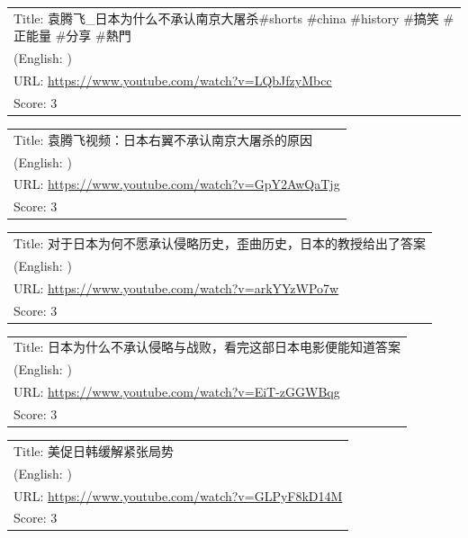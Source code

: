 \documentclass{article}
\begin{document}
\noindent
\begin{tabular}{p{}}
Title: 袁腾飞\_日本为什么不承认南京大屠杀\#shorts \#china \#history  \#搞笑 \#正能量 \#分享 \#熱門 \\
(English: ) \\
URL: \url{https://www.youtube.com/watch?v=LQbJfzyMbcc} \\
Score: 3 \\
\end{tabular}
\vspace{0.5em}

\noindent
\begin{tabular}{p{}}
Title: 袁腾飞视频：日本右翼不承认南京大屠杀的原因 \\
(English: ) \\
URL: \url{https://www.youtube.com/watch?v=GpY2AwQaTjg} \\
Score: 3 \\
\end{tabular}
\vspace{0.5em}

\noindent
\begin{tabular}{p{}}
Title: 对于日本为何不愿承认侵略历史，歪曲历史，日本的教授给出了答案 \\
(English: ) \\
URL: \url{https://www.youtube.com/watch?v=arkYYzWPo7w} \\
Score: 3 \\
\end{tabular}
\vspace{0.5em}

\noindent
\begin{tabular}{p{}}
Title: 日本为什么不承认侵略与战败，看完这部日本电影便能知道答案 \\
(English: ) \\
URL: \url{https://www.youtube.com/watch?v=EiT-zGGWBqg} \\
Score: 3 \\
\end{tabular}
\vspace{0.5em}

\noindent
\begin{tabular}{p{}}
Title: 美促日韩缓解紧张局势 \\
(English: ) \\
URL: \url{https://www.youtube.com/watch?v=GLPyF8kD14M} \\
Score: 3 \\
\end{tabular}
\vspace{0.5em}
\end{document}
